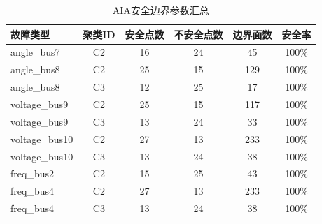 \begin{table}[htbp]
\centering
\caption{AIA安全边界参数汇总}
\label{tab:aia_boundary}
\begin{tabular}{lccccc}
\toprule
故障类型 & 聚类ID & 安全点数 & 不安全点数 & 边界面数 & 安全率 \\
\midrule
angle\_bus7 & C2 & 16 & 24 & 45 & 100\% \\
angle\_bus8 & C2 & 25 & 15 & 129 & 100\% \\
angle\_bus8 & C3 & 12 & 25 & 17 & 100\% \\
voltage\_bus9 & C2 & 25 & 15 & 117 & 100\% \\
voltage\_bus9 & C3 & 13 & 24 & 33 & 100\% \\
voltage\_bus10 & C2 & 27 & 13 & 233 & 100\% \\
voltage\_bus10 & C3 & 13 & 24 & 38 & 100\% \\
freq\_bus2 & C2 & 15 & 25 & 43 & 100\% \\
freq\_bus4 & C2 & 27 & 13 & 233 & 100\% \\
freq\_bus4 & C3 & 13 & 24 & 38 & 100\% \\
\bottomrule
\end{tabular}
\end{table}
